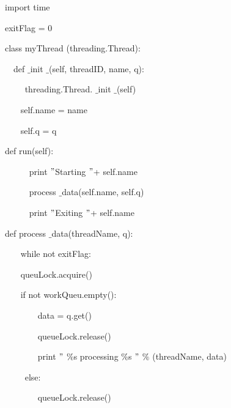 \documentclass{wileySix}
\begin{document}
\begin{myEnumerate}
\noindent 
{\fontsize{10pt}{10pt}\selectfont import time} \par
\vspace{10pt}
\noindent 
{\fontsize{10pt}{10pt}\selectfont exitFlag = 0} \par
\vspace{10pt}
\noindent 
{\fontsize{10pt}{10pt}\selectfont class myThread (threading.Thread):} \par
\noindent 
{\fontsize{10pt}{10pt}\selectfont ~~def   $  \_  $init $  \_  $(self, threadID, name, q):} \par
\noindent 
{\fontsize{10pt}{10pt}\selectfont ~~~~ threading.Thread. $  \_  $init $  \_  $(self)} \par
\noindent 
{\fontsize{10pt}{10pt}\selectfont ~~~ self.name = name} \par
\noindent 
{\fontsize{10pt}{10pt}\selectfont ~~~ self.q = q} \par
\noindent 
{\fontsize{10pt}{10pt}\selectfont  def run(self):} \par
\noindent 
{\fontsize{10pt}{10pt}\selectfont ~~~~~ print  $ " $Starting  $ " $+ self.name} \par
\noindent 
{\fontsize{10pt}{10pt}\selectfont ~~~~~ process $  \_  $data(self.name, self.q)} \par
\noindent 
{\fontsize{10pt}{10pt}\selectfont ~~~~~ print  $ " $Exiting  $ " $+ self.name} \par
\vspace{10pt}
\noindent 
{\fontsize{10pt}{10pt}\selectfont def process $  \_  $data(threadName, q):} \par
\noindent 
{\fontsize{10pt}{10pt}\selectfont ~~~ while not exitFlag:} \par
\noindent 
{\fontsize{10pt}{10pt}\selectfont ~~~ queuLock.acquire()} \par
\noindent 
{\fontsize{10pt}{10pt}\selectfont ~~~ if not workQueu.empty():} \par
\noindent 
{\fontsize{10pt}{10pt}\selectfont ~~~~~~~ data = q.get()} \par
\noindent 
{\fontsize{10pt}{10pt}\selectfont ~~~~~~~ queueLock.release()} \par
\noindent 
{\fontsize{10pt}{10pt}\selectfont ~~~~~~~ print  $ " $ $  \%  $s processing  $  \%  $s $ " $  $  \%  $ (threadName, data)} \par
\noindent 
{\fontsize{10pt}{10pt}\selectfont ~~~~ else:} \par
\noindent 
{\fontsize{10pt}{10pt}\selectfont ~~~~~~~ queueLock.release()} \par

\end{myEnumerate}
\end{document}
